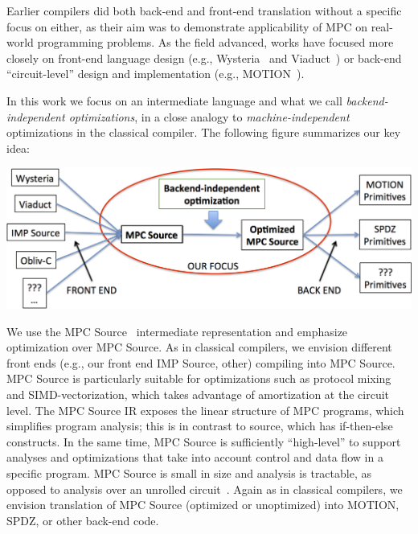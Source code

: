 Earlier compilers did both back-end and front-end translation without a specific focus on either, as their aim was to demonstrate applicability of MPC on real-world
programming problems. As the field advanced, works have focused more closely on front-end language design (e.g., Wysteria~\cite{SP:RasHamHic14} and Viaduct~\cite{Acay:2021})
or back-end ``circuit-level'' design and implementation (e.g., MOTION~\cite{Braun:2022}).

In this work we focus on an intermediate language and what we call \emph{backend-independent optimizations}, in a close analogy to \emph{machine-independent} optimizations
in the classical compiler. The following figure summarizes our key idea:

{\begin{center}
\includegraphics[width=0.8\linewidth]{figs_paper_SIMD/focus.png}
\end{center}
}

We use the MPC Source~\cite{Ishaq:2019} intermediate representation and emphasize optimization over MPC Source. As in classical compilers, we envision different front ends (e.g., our front end IMP Source, other) compiling into MPC Source. MPC Source is particularly suitable for optimizations such as protocol mixing~\cite{Ishaq:2019, Fang:2022} and SIMD-vectorization,
which takes advantage of amortization at the circuit level. The MPC Source IR exposes the linear structure of MPC programs, which simplifies program analysis; this is
in contrast to source, which has if-then-else constructs. In the same time, MPC Source is sufficiently ``high-level''  to support analyses and optimizations that take into account
control and data flow in a specific program. MPC Source is small in size and analysis is tractable, as opposed to analysis over an unrolled circuit~\cite{Ishaq:2019}. Again as
in classical compilers, we envision translation of MPC Source (optimized or unoptimized) into MOTION, SPDZ, or other back-end code.




